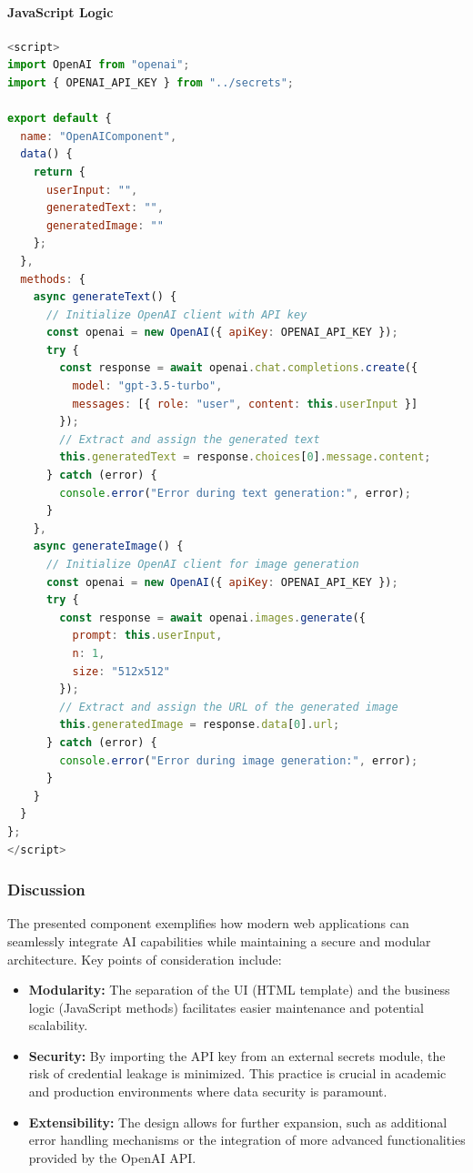 \paragraph{JavaScript Logic}


\begin{lstlisting}[language=JavaScript, caption=Vue.js Script for OpenAI API Integration]
<script>
import OpenAI from "openai";
import { OPENAI_API_KEY } from "../secrets";

export default {
  name: "OpenAIComponent",
  data() {
    return {
      userInput: "",
      generatedText: "",
      generatedImage: ""
    };
  },
  methods: {
    async generateText() {
      // Initialize OpenAI client with API key
      const openai = new OpenAI({ apiKey: OPENAI_API_KEY });
      try {
        const response = await openai.chat.completions.create({
          model: "gpt-3.5-turbo",
          messages: [{ role: "user", content: this.userInput }]
        });
        // Extract and assign the generated text
        this.generatedText = response.choices[0].message.content;
      } catch (error) {
        console.error("Error during text generation:", error);
      }
    },
    async generateImage() {
      // Initialize OpenAI client for image generation
      const openai = new OpenAI({ apiKey: OPENAI_API_KEY });
      try {
        const response = await openai.images.generate({
          prompt: this.userInput,
          n: 1,
          size: "512x512"
        });
        // Extract and assign the URL of the generated image
        this.generatedImage = response.data[0].url;
      } catch (error) {
        console.error("Error during image generation:", error);
      }
    }
  }
};
</script>
\end{lstlisting}

\subsubsection{Discussion}

The presented component exemplifies how modern web applications can seamlessly integrate AI capabilities while maintaining a secure and modular architecture. Key points of consideration include:
\begin{itemize}
    \item \textbf{Modularity:} The separation of the UI (HTML template) and the business logic (JavaScript methods) facilitates easier maintenance and potential scalability.
    \item \textbf{Security:} By importing the API key from an external secrets module, the risk of credential leakage is minimized. This practice is crucial in academic and production environments where data security is paramount.
    \item \textbf{Extensibility:} The design allows for further expansion, such as additional error handling mechanisms or the integration of more advanced functionalities provided by the OpenAI API.
\end{itemize}

